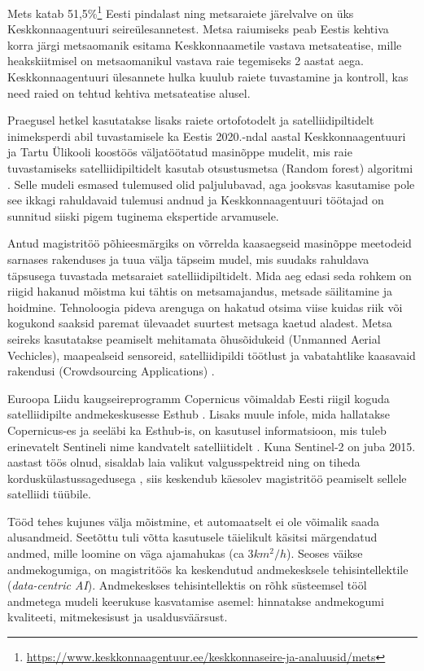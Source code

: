 Mets katab 51,5\%\footnote{\url{https://www.keskkonnaagentuur.ee/keskkonnaseire-ja-analuusid/mets}} Eesti pindalast ning metsaraiete järelvalve on üks Keskkonnaagentuuri seireülesannetest. Metsa raiumiseks peab Eestis kehtiva korra järgi metsaomanik esitama Keskkonnaametile vastava metsateatise, mille heakskiitmisel on metsaomanikul vastava raie tegemiseks 2 aastat aega. Keskkonnaagentuuri ülesannete hulka kuulub raiete tuvastamine ja kontroll, kas need raied on tehtud kehtiva metsateatise alusel.  

Praegusel hetkel kasutatakse lisaks raiete ortofotodelt ja satelliidipiltidelt inimeksperdi abil tuvastamisele ka Eestis 2020.-ndal aastal Keskkonnaagentuuri ja Tartu Ülikooli koostöös väljatöötatud masinõppe mudelit, mis raie tuvastamiseks satelliidipiltidelt kasutab otsustusmetsa (Random forest) algoritmi \cite{TartuUlikooliTeadlased2020}. Selle mudeli esmased tulemused olid paljulubavad, aga jooksvas kasutamise pole see ikkagi rahuldavaid tulemusi andnud ja Keskkonnaagentuuri töötajad on sunnitud siiski pigem tuginema ekspertide arvamusele.

Antud magistritöö põhieesmärgiks on võrrelda kaasaegseid masinõppe meetodeid sarnases rakenduses ja tuua välja täpseim mudel, mis suudaks rahuldava täpsusega tuvastada metsaraiet satelliidipiltidelt. Mida aeg edasi seda rohkem on riigid hakanud mõistma kui tähtis on metsamajandus, metsade säilitamine ja hoidmine. Tehnoloogia pideva arenguga on hakatud otsima viise kuidas riik või kogukond saaksid paremat ülevaadet suurtest metsaga kaetud aladest. Metsa seireks kasutatakse peamiselt mehitamata õhusõidukeid (Unmanned Aerial Vechicles), maapealseid sensoreid, satelliidipildi töötlust ja vabatahtlike kaasavaid rakendusi (Crowdsourcing Applications) \cite{cheungPerimeterDefense42015}.

Euroopa Liidu kaugseireprogramm Copernicus võimaldab Eesti riigil koguda satelliidipilte andmekeskusesse Esthub \cite{maa-ametRiiklikSatelliidiandmeteKeskus}. Lisaks muule infole, mida hallatakse Copernicus-es ja seeläbi ka Esthub-is, on kasutusel informatsioon, mis tuleb erinevatelt Sentineli nime kandvatelt satelliitidelt \cite{InfrastructureOverviewCopernicus}. Kuna Sentinel-2 on juba 2015. aastast töös olnud, sisaldab laia valikut valgusspektreid ning on tiheda korduskülastussagedusega \cite{Sentinel2OverviewScienceDirect}, siis keskendub käesolev magistritöö peamiselt sellele satelliidi tüübile.

Tööd tehes kujunes välja mõistmine, et automaatselt ei ole võimalik saada alusandmeid. Seetõttu tuli võtta kasutusele täielikult käsitsi märgendatud andmed, mille loomine on väga ajamahukas (ca 3$km^2/h$). Seoses väikse andmekogumiga, on magistritöös ka keskendutud andmekesksele tehisintellektile (\textit{data-centric AI}). Andmekeskses tehisintellektis on rõhk süsteemsel tööl andmetega mudeli keerukuse kasvatamise asemel: hinnatakse andmekogumi kvaliteeti, mitmekesisust ja usaldusväärsust.

